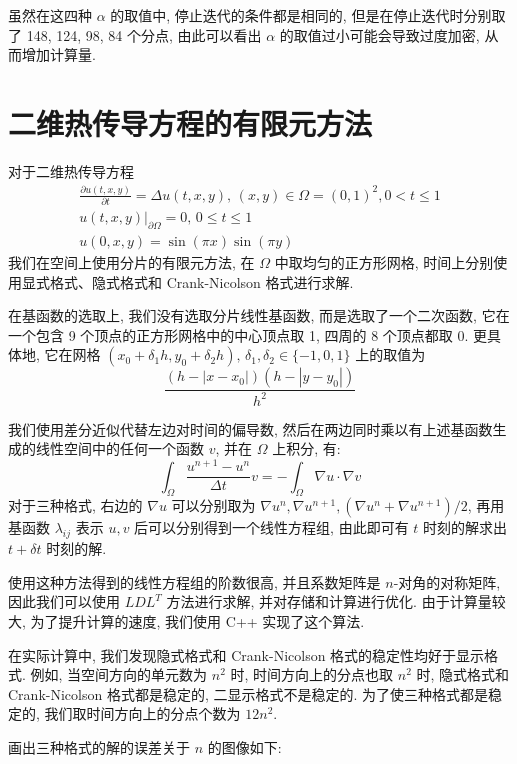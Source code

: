 \documentclass[UTF8]{article}
\begin{document}
    虽然在这四种 $\alpha$ 的取值中, 停止迭代的条件都是相同的, 但是在停止迭代时分别取了 148, 124, 98, 84 个分点, 由此可以看出 $\alpha$ 的取值过小可能会导致过度加密, 从而增加计算量.


    \section{二维热传导方程的有限元方法}

    对于二维热传导方程
    \begin{gather*}
        \frac{\partial u(t,x,y)}{\partial t} = \Delta u(t,x,y),\,(x,y)\in\Omega=(0,1)^2,0<t\le 1\\
        u(t,x,y)|_{\partial \Omega} = 0,\,0\le t \le 1\\
        u(0,x,y) = \sin(\pi x)\sin(\pi y)
    \end{gather*}
    我们在空间上使用分片的有限元方法, 在 $\Omega$ 中取均匀的正方形网格, 时间上分别使用显式格式、隐式格式和 Crank-Nicolson 格式进行求解.

    在基函数的选取上, 我们没有选取分片线性基函数, 而是选取了一个二次函数, 它在一个包含 9 个顶点的正方形网格中的中心顶点取 1, 四周的 8 个顶点都取 0.
    更具体地, 它在网格 $(x_0+\delta_1 h,y_0+\delta_2 h),\,\delta_1,\delta_2\in\{-1,0,1\}$ 上的取值为
    \[
        \frac{(h-| x-x_0 |)(h-| y-y_0 |)}{h^2}
    \]

    我们使用差分近似代替左边对时间的偏导数, 然后在两边同时乘以有上述基函数生成的线性空间中的任何一个函数 $v$, 并在 $\Omega$ 上积分, 有:
    \[
        \int_{\Omega} \frac{u^{n+1}-u^n}{\Delta t}v = -\int_{\Omega} \nabla u\cdot\nabla v
    \]
    对于三种格式, 右边的 $\nabla u$ 可以分别取为 $\nabla u^n, \nabla u^{n+1}, (\nabla u^n+\nabla u^{n+1})/2$, 再用基函数 $\lambda_{ij}$ 表示 $u, v$ 后可以分别得到一个线性方程组, 由此即可有 $t$ 时刻的解求出 $t+\delta t$ 时刻的解.

    使用这种方法得到的线性方程组的阶数很高, 并且系数矩阵是 $n$-对角的对称矩阵, 因此我们可以使用 $LDL^T$ 方法进行求解, 并对存储和计算进行优化.
    由于计算量较大, 为了提升计算的速度, 我们使用 C++ 实现了这个算法.

    在实际计算中, 我们发现隐式格式和 Crank-Nicolson 格式的稳定性均好于显示格式.
    例如, 当空间方向的单元数为 $n^2$ 时, 时间方向上的分点也取 $n^2$ 时, 隐式格式和 Crank-Nicolson 格式都是稳定的, 二显示格式不是稳定的.
    为了使三种格式都是稳定的, 我们取时间方向上的分点个数为 $12n^2$.

    画出三种格式的解的误差关于 $n$ 的图像如下:
\end{document}
